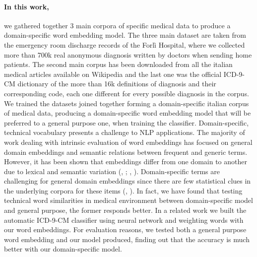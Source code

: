 \paragraph{In this work,}
we gathered together 3 main corpora of specific medical data to produce a domain-specific word embedding model. The three main dataset are taken from the emergency room discharge records of the Forlì Hospital, where we collected more than 700k real anonymous diagnosis written by doctors when sending home patients. The second main corpus has been downloaded from all the italian medical articles available on Wikipedia and the last one was the official ICD-9-CM dictionary of the more than 16k definitions of diagnosis and their corresponding code, each one different for every possible diagnosis in the corpus.\\
We trained the datasets joined together forming a domain-specific italian corpus of medical data, producing a domain-specific word embedding model that will be preferred to a general purpose one, when training the classifier.
Domain-specific, technical vocabulary presents a challenge to NLP applications. The majority of work dealing with intrinsic evaluation of word embeddings has focused on general domain embeddings and semantic relations between frequent and generic terms. However, it has been shown that embeddings differ from one domain to another due to lexical and semantic variation (\citeauthor{hamilton2016diachronic}, \citeyear{hamilton2016diachronic}; \citeauthor{bollegala2015unsupervised}, \citeyear{bollegala2015unsupervised}). Domain-specific terms are challenging for general domain embeddings since there are few statistical clues in the underlying corpora for these items (\citeauthor{bollegala2015unsupervised}, \citeyear{bollegala2015unsupervised}).
In fact, we have found that testing technical word similarities in medical environment between domain-specific model and general purpose, the former responds better. In a related work we built the automatic ICD-9-CM classifier using neural network and weighting words with our word embeddings. For evaluation reasons, we tested both a general purpose word embedding and our model produced, finding out that the accuracy is much better with our domain-specific model. 

